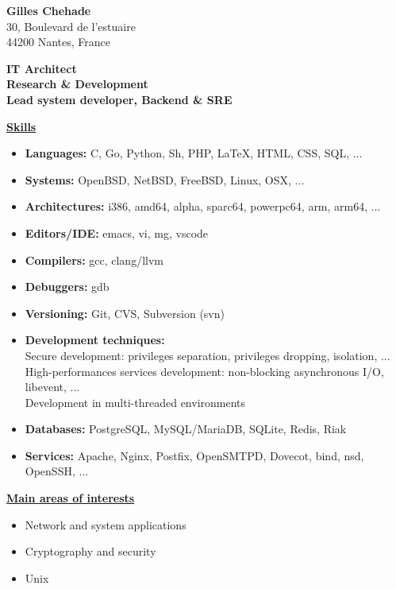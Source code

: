 \documentclass[a4paper,10pt]{letter}
\begin{document}
\textbf{Gilles Chehade}\\
30, Boulevard de l'estuaire\\
44200 Nantes, France\\

\begin{center}
  \large
  \textbf {
    IT Architect\\
    Research \& Development\\
    Lead system developer, Backend \& SRE\\
  }
\end{center}

\normalsize

\underline{\textbf{Skills}}\\
\begin{itemize}
\item	\textbf{Languages:}
  C, Go, Python, Sh, PHP, \LaTeX, HTML, CSS, SQL, ...
\item	\textbf{Systems:}
  OpenBSD, NetBSD, FreeBSD, Linux, OSX, ...
\item	\textbf{Architectures:}
  i386, amd64, alpha, sparc64, powerpc64, arm, arm64, ...
\item	\textbf{Editors/IDE:}
  emacs, vi, mg, vscode
\item	\textbf{Compilers:}
  gcc, clang/llvm
\item	\textbf{Debuggers:}
  gdb
\item	\textbf{Versioning:}
  Git, CVS, Subversion (svn)
\item	\textbf{Development techniques:}\\
  Secure development:
  privileges separation, privileges dropping, isolation, ...\\
  High-performances services development:
  non-blocking asynchronous I/O, libevent, ...\\
  Development in multi-threaded environments

\item	\textbf{Databases:}
  PostgreSQL, MySQL/MariaDB, SQLite, Redis, Riak
\item	\textbf{Services:}
  Apache, Nginx, Postfix, OpenSMTPD, Dovecot, bind, nsd, OpenSSH, ...\\
\end{itemize}

\underline{\textbf{Main areas of interests}}\\
\begin{itemize}
\item Network and system applications
\item Cryptography and security
\item Unix\\
\end{itemize}
\end{document}

